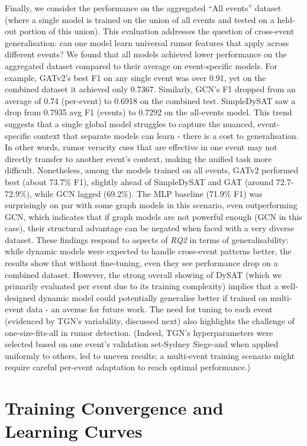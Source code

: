 \documentclass{cshonours}
\begin{document}
Finally, we consider the performance on the aggregated ``All events'' dataset (where a single model is trained on the union of all events and tested on a held-out portion of this union). This evaluation addresses the question of cross-event generalisation: can one model learn universal rumor features that apply across different events? We found that all models achieved lower performance on the aggregated dataset compared to their average on event-specific models. For example, GATv2's best F1 on any single event was over 0.91, yet on the combined dataset it achieved only 0.7367. Similarly, GCN's F1 dropped from an average of 0.74 (per-event) to 0.6918 on the combined test. SimpleDySAT saw a drop from 0.7935 avg F1 (events) to 0.7292 on the all-events model. This trend suggests that a single global model struggles to capture the nuanced, event-specific context that separate models can learn - there is a cost to generalisation. In other words, rumor veracity cues that are effective in one event may not directly transfer to another event's context, making the unified task more difficult. Nonetheless, among the models trained on all events, GATv2 performed best (about 73.7\% F1), slightly ahead of SimpleDySAT and GAT (around 72.7-72.9\%), while GCN lagged (69.2\%). The MLP baseline (71.9\% F1) was surprisingly on par with some graph models in this scenario, even outperforming GCN, which indicates that if graph models are not powerful enough (GCN in this case), their structural advantage can be negated when faced with a very diverse dataset. These findings respond to aspects of \emph{RQ2} in terms of generalisability: while dynamic models were expected to handle cross-event patterns better, the results show that without fine-tuning, even they see performance drop on a combined dataset. However, the strong overall showing of DySAT (which we primarily evaluated per event due to its training complexity) implies that a well-designed dynamic model could potentially generalise better if trained on multi-event data - an avenue for future work. The need for tuning to each event (evidenced by TGN's variability, discussed next) also highlights the challenge of one-size-fits-all in rumor detection. (Indeed, TGN's hyperparameters were selected based on one event's validation set-Sydney Siege-and when applied uniformly to others, led to uneven results; a multi-event training scenario might require careful per-event adaptation to reach optimal performance.)



\section{Training Convergence and Learning Curves}
\end{document}
